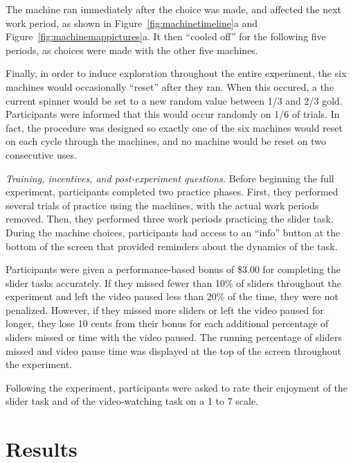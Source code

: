 \documentclass[10pt,letterpaper]{article}
\begin{document}
The machine ran immediately after the choice was
made, and affected the next work period, as shown in
Figure~\ref{fig:machinetimeline}a and Figure~\ref{fig:machinemappictures}a. It then ``cooled off'' for the
following five periods, as choices were made with the other five machines.

Finally, in order to induce exploration throughout the entire experiment, the
six machines would occasionally ``reset'' after they ran. When this occured, a
the current spinner would be set to a new random value between 1/3 and 2/3 gold.
Participants were informed that this would occur randomly on
1/6 of trials. In fact, the procedure was designed so exactly one of the six
machines would reset on each cycle through the machines, and no machine would be
reset on two consecutive uses.

\emph{Training, incentives, and post-experiment questions.}
Before beginning the full experiment, participants completed two
practice phases. First, they performed several trials of practice using the
machines, with the actual work periods removed. Then, they performed three work
periods practicing the slider task.
During the machine choices, participants had access to an ``info'' button at the
bottom of the screen that provided reminders about the dynamics of the task.

Participants were given a performance-based bonus of \$3.00 for completing the
slider tasks accurately. If they missed fewer than 10\% of sliders throughout
the experiment and left the video paused less than 20\% of the time, they were
not penalized. However, if they missed more sliders or left the video paused for
longer, they lose 10 cents from their bonus for each additional percentage of
sliders missed or time with the video paused. The running percentage of sliders
missed and video pause time was displayed at the top of the screen throughout
the experiment.

Following the experiment, participants were asked to rate their enjoyment of the
slider task and of the video-watching task on a 1 to 7 scale.


\section{Results}
\end{document}

